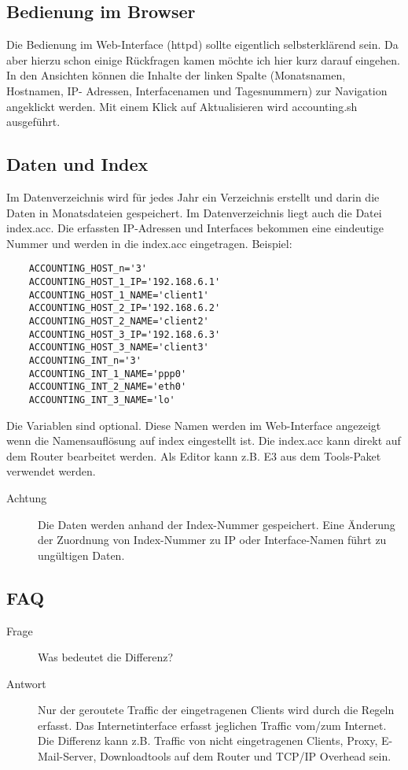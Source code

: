 \subsection{Bedienung im Browser}
Die Bedienung im Web-Interface (httpd) sollte eigentlich selbsterklärend sein. Da aber
hierzu schon einige Rückfragen kamen möchte ich hier kurz darauf eingehen.
In den Ansichten können die Inhalte der linken Spalte (Monatsnamen, Hostnamen, IP-
Adressen, Interfacenamen und Tagesnummern) zur Navigation angeklickt werden.
Mit einem Klick auf Aktualisieren wird accounting.sh ausgeführt.

\subsection{Daten und Index}
Im Datenverzeichnis wird für jedes Jahr ein Verzeichnis erstellt und darin die Daten in
Monatsdateien gespeichert.
Im Datenverzeichnis liegt auch die Datei index.acc. Die erfassten IP-Adressen und
Interfaces bekommen eine eindeutige Nummer und werden in die index.acc eingetragen.
Beispiel:
\begin{example}
\begin{verbatim}
    ACCOUNTING_HOST_n='3'
    ACCOUNTING_HOST_1_IP='192.168.6.1'
    ACCOUNTING_HOST_1_NAME='client1'
    ACCOUNTING_HOST_2_IP='192.168.6.2'
    ACCOUNTING_HOST_2_NAME='client2'
    ACCOUNTING_HOST_3_IP='192.168.6.3'
    ACCOUNTING_HOST_3_NAME='client3'
    ACCOUNTING_INT_n='3'
    ACCOUNTING_INT_1_NAME='ppp0'
    ACCOUNTING_INT_2_NAME='eth0'
    ACCOUNTING_INT_3_NAME='lo'
\end{verbatim}
\end{example}
Die Variablen  sind optional. Diese Namen werden im
Web-Interface angezeigt wenn die Namensauflösung auf index eingestellt ist.
Die index.acc kann direkt auf dem Router bearbeitet werden. Als Editor kann z.B. E3 aus
dem Tools-Paket verwendet werden.
\begin{description}
\item[Achtung] Die Daten werden anhand der Index-Nummer gespeichert. Eine Änderung
der Zuordnung von Index-Nummer zu IP oder Interface-Namen führt zu
ungültigen Daten.
\end{description}

\subsection{FAQ}
\begin{description}
\item[Frage] Was bedeutet die Differenz?
\item[Antwort] Nur der geroutete Traffic der eingetragenen Clients wird durch die Regeln erfasst.
Das Internetinterface erfasst jeglichen Traffic vom/zum Internet. Die Differenz kann
z.B. Traffic von nicht eingetragenen Clients, Proxy, E-Mail-Server, Downloadtools
auf dem Router und TCP/IP Overhead sein.
\end{description}

